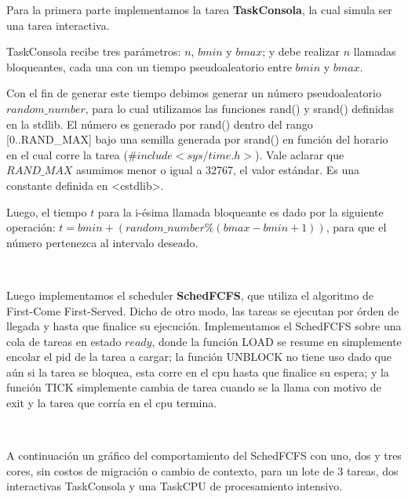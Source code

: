 Para la primera parte implementamos la tarea \textbf{TaskConsola}, la cual simula ser una tarea interactiva.

TaskConsola recibe tres parámetros: $n$, $bmin$ y $bmax$; y debe realizar $n$ llamadas bloqueantes, cada una con un tiempo pseudoaleatorio entre $bmin$ y $bmax$. 

Con el fin de generar este tiempo debimos generar un número pseudoaleatorio $random\_number$, para lo cual utilizamos las funciones rand() y srand() definidas en la stdlib. El número es generado por rand() dentro del rango [0..RAND\_MAX] bajo una semilla generada por srand() en función del horario en el cual corre la tarea ($\#include <sys/time.h>$). Vale aclarar que $RAND\_MAX$ asumimos menor o igual a 32767, el valor estándar. Es una constante definida en <cstdlib>.

Luego, el tiempo $t$ para la i-ésima llamada bloqueante es dado por la siguiente operación: $t = bmin + (random\_number \% (bmax-bmin+1))$, para que el número pertenezca al intervalo deseado.

~

Luego implementamos el scheduler \textbf{SchedFCFS}, que utiliza el algoritmo de First-Come First-Served. Dicho de otro modo, las tareas se ejecutan por órden de llegada y hasta que finalice su ejecución. Implementamos el SchedFCFS sobre una cola de tareas en estado $ready$, donde la función LOAD se resume en simplemente encolar el pid de la tarea a cargar; la función UNBLOCK no tiene uso dado que aún si la tarea se bloquea, esta corre en el cpu hasta que finalice su espera; y la función TICK simplemente cambia de tarea cuando se la llama con motivo de exit y la tarea que corría en el cpu termina.

~

A continuación un gráfico del comportamiento del SchedFCFS con uno, dos y tres cores, sin costos de migración o cambio de contexto, para un lote de 3 tareas, dos interactivas TaskConsola y una TaskCPU de procesamiento intensivo.

